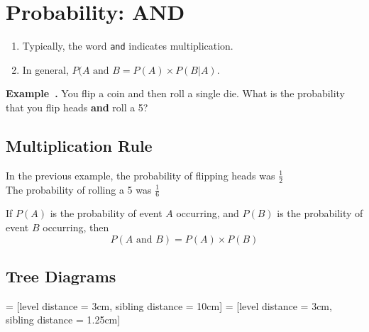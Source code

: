 \documentclass{article}
\newcounter{example}[section]
\newenvironment{example}[1][]{\refstepcounter{example}\par\medskip
   {\color{red}\textbf{Example~\theexample. #1}}}{\medskip}
\begin{document}
\section*{Probability: AND}

\begin{tcolorbox}[colframe=orange!70!white, coltitle=black, title=\textbf{Summary}]
\begin{enumerate}
    \item Typically, the word \texttt{and} indicates multiplication.
    \item In general, $P(A \text{ and } B = P(A) \times P(B | A)$.
\end{enumerate}
\end{tcolorbox}
\vspace{0.75in}

\begin{example}
You flip a coin and then roll a single die. What is the probability that you flip heads {\color{blue}\textbf{and}} roll a 5?
\end{example}
\vspace{1in}

\subsection*{Multiplication Rule}

In the previous example, the probability of flipping heads was $\frac{1}{2}$	\newline\\	
The probability of rolling a 5 was $\frac{1}{6}$	
\vspace{1in}
\begin{tcolorbox}[colframe=green!20!black, colback = green!30!white,title=\textbf{Multiplication Rule}]
If $P(A)$ is the probability of event $A$ occurring, and $P(B)$ is the probability of event $B$ occurring, then
\[P(A\text{ and } B) = P(A) \times P(B)\]
\end{tcolorbox}

\vfill 

\subsection*{Tree Diagrams}

\begin{center}
 = [level distance = 3cm, sibling distance = 10cm]
 = [level distance = 3cm, sibling distance = 1.25cm]
\end{center}
\end{document}
